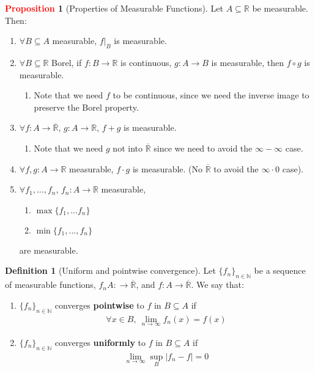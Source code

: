 \documentclass[reqno,11pt]{amsart}
\theoremstyle{definition}
\newtheorem{question}{Question}
\newcommand{\bb}[1]{\mathbb{#1}}
\theoremstyle{definition}
\newtheorem{definition}{\textcolor{OliveGreen}{Definition}}
\newtheorem{prop}{\textcolor{red}{Proposition}}
\theoremstyle{remark}
\begin{document}
\begin{prop}[Properties of Measurable Functions]
	Let $A \subseteq \bb{R}$ be measurable. Then: 
	\begin{enumerate}[nolistsep]
		\item $\forall B \subseteq A$ measurable, $f|_B$ is measurable. 
		\item $\forall B \subseteq \bb{R}$ Borel, if $f: B \rightarrow \bb{R}$ is continuous, $g: A \rightarrow B$ is measurable, then $f \circ g$ is measurable. 
		\begin{enumerate}[nolistsep]
			\item Note that we need $f$ to be continuous, since we need the inverse image to preserve the Borel property. 
		\end{enumerate}
		\item $\forall f: A \rightarrow \overline{\bb{R}}$, $g: A \rightarrow \bb{R}$, $f+g$ is measurable. 
		\begin{enumerate}[nolistsep]
			\item Note that we need $g$ not into $\overline{\bb{R}}$ since we need to avoid the $\infty - \infty$ case. 
		\end{enumerate}
		\item $\forall f, g: A \rightarrow \bb{R}$ measurable, $f \cdot g$ is measurable. (No $\overline{\bb{R}}$ to avoid the $\infty \cdot 0$ case). 
		\item $\forall f_1, ..., f_n$, $f_n: A \rightarrow \bb{R}$ measurable, 
		\begin{enumerate}[nolistsep]
			\item $\max \{f_1,...f_n \}$ 
			\item $\min \{f_1, ..., f_n \}$ 
		\end{enumerate}
		are measurable. 
	\end{enumerate}
\end{prop}


\begin{definition}[Uniform and pointwise convergence] 
	Let $\{ f_n \}_{n \in \bb{N}}$ be a sequence of measurable functions, $f_n A: \rightarrow \overline{\bb{R}}$, and $f: A \rightarrow \overline{\bb{R}}$. We say that: 
	\begin{enumerate}[noitemsep]
		\item $\{ f_n \}_{n \in \bb{N}}$ converges \textbf{pointwise} to $f$ in $B \subseteq A$ if 
		\begin{align*}
			\forall x \in B,\ \lim_{n \rightarrow \infty} f_n(x) = f(x) 	
		\end{align*}
		\item $\{ f_n \}_{n \in \bb{N}}$ converges \textbf{uniformly} to $f$ in $B \subseteq A$ if 
		\begin{align*}
			\lim_{n \rightarrow \infty} \sup_B | f_n - f| = 0 	
		\end{align*}

	\end{enumerate}
\end{definition}
\end{document}
